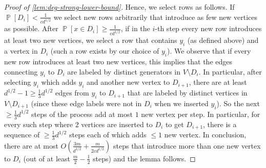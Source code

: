 \documentclass[10pt,a4paper]{article}
\newcommand{\prettyref}[1]{\cref{#1}}
\theoremstyle{definition}
\theoremstyle{remark}
\newcommand{\Psymb}{\mathbb{P}}
\DeclareMathOperator*{\ProbOp}{\Psymb}
\renewcommand{\Pr}{\ProbOp}
\newcommand{\prob}[1]{\Pr \left[ {#1} \right] }
\renewcommand{\le}{\leqslant}
\renewcommand{\geq}{\geqslant}
\renewcommand{\ge}{\geqslant}
\numberwithin{equation}{section}
\let\pref=\prettyref
\begin{document}
\begin{proof}[Proof of \pref{lem:deg-strong-lower-bound}]
    Hence, we select rows as follows. If \(\prob{D_i} < \frac{1}{c d^{1/2}}\) we select new rows arbitrarily that introduce as few new vertices as possible. After \(\prob{x\in D_i} \ge \frac{1}{c d^{1/2}}\), if in the \(i\)-th step every new row introduces at least two new vertices, we select a row that contains \(y_i\) (as defined above) and a vertex in \(D_i\) (such a row exists by our choice of \(y_i\)). We observe that if every new row introduces at least two new vertices, this implies that the edges connecting \(y_i\) to $D_i$ are labeled by distinct generators in \(V \setminus D_i\). In particular, after selecting \(y_i\) which adds \(y_i\) and another new vertex to \(D_{i+1}\), there are at least \(d^{1/2} - 1 \geq \frac{1}{3} d^{1/2}\) edges from \(y_i\) to \(D_{i+1}\) that are labeled by distinct vertices in \(V \setminus D_{i+1}\) (since these edge labels were not in \(D_i\) when we inserted \(y_i\)). So the next $\ge \frac{1}{3}d^{1/2}$ steps of the process add at most $1$ new vertex per step. In particular, for every such step where \(2\) vertices are inserted to \(D_i\) to get \(D_{i+1}\), there is a sequence of \(\geq \frac{1}{3}d^{1/2}\) steps each of which adds  \(\le 1\) new vertex. In conclusion, there are at most \(O(\frac{3m}{d^{1/2}} + \frac{m}{2c d^{1/2}})\)  steps that introduce more than one new vertex to \(D_i\) (out of at least \(\frac{m}{2}-\frac{1}{2}\) steps) and the lemma follows.
\end{proof}
\end{document}
